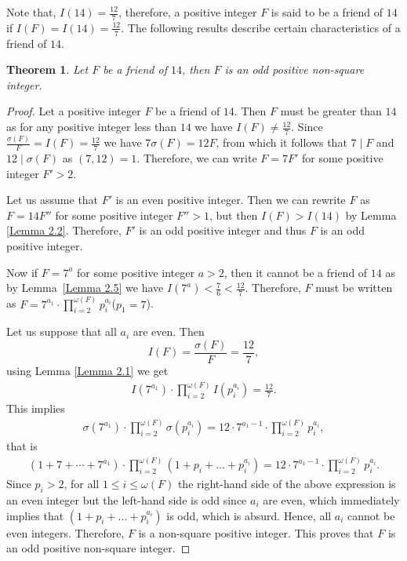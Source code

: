 \documentclass[11pt,twoside]{amsart}
\newtheorem{theorem}{Theorem}[section]
\begin{document}
Note that, $I(14)=\frac{12}{7}$, therefore, a positive integer $F$ is said to be a friend of $14$ if $I(F)=I(14)=\frac{12}{7}$. The following results describe certain characteristics of a friend of $14$.
\begin{theorem}\label{thm 3.1}
Let $F$ be a friend of $14$, then $F$ is an odd positive non-square integer.   
\end{theorem}
\begin{proof}
    Let a positive integer $F$ be a friend of $14$. Then $F$ must be greater than $14$ as for any positive integer less than $14$ we have $I(F)\neq \frac{12}{7}$. Since $\frac{\sigma(F)}{F}=I(F)=\frac{12}{7}$ we have $7\sigma(F)=12F$, from which it follows that $7\mid F$ and $12\mid \sigma(F)$ as $(7,12)=1$. Therefore, we can write $F=7F'$ for some positive integer $F'>2$. 

Let us  assume that $F'$ is an even positive integer. Then we can rewrite $F$ as $F=14F''$ for some positive integer $F''>1$, but then $I(F)>I(14)$ by Lemma \ref{Lemma 2.2}. Therefore, $F'$ is an odd positive integer and thus $F$ is an odd positive integer.

    Now if $F=7^a$ for some positive integer $a>2$, then it cannot be a friend of $14$ as by Lemma~\ref{Lemma 2.5} we have $I(7^{a})<\frac{7}{6}<\frac{12}{7}$. Therefore, $F$ must be written as $\displaystyle{F=7^{a_{1}}\cdot \prod_{i=2}^{\omega(F)}p_{i}^{a_{i}}}$($p_1=7$). 

Let us suppose that all $a_i$ are even. Then
$$I(F)=\frac{\sigma(F)}{F}=\frac{12}{7},$$
using Lemma \ref{Lemma 2.1} we get
\begin{align*}
   I(7^{a_1})\cdot \prod_{i=2}^{\omega(F)}I(p_{i}^{a_i})=\frac{12}{7}.
   \end{align*}
   This implies
   \begin{align*}
 \sigma(7^{a_1})\cdot \prod_{i=2}^{\omega(F)}\sigma(p_i^{a_i})=12\cdot7^{{a_1}-1}\cdot\prod_{i=2}^{\omega(F)}p_{i}^{a_i},
\end{align*}
that is
\begin{align*}
 (1+7+ \cdots +7^{a_1})\cdot\prod_{i=2}^{\omega(F)}(1+p_i+\dots+p_i^{a_i})=12\cdot7^{{a_1}-1}\cdot\prod_{i=2}^{\omega(F)}p_{i}^{a_i}.
\end{align*}
Since $p_i>2$, for all $1\leq i\leq \omega(F)$ the right-hand side of the above expression is an even integer but the left-hand side is odd since $a_i$ are even, which immediately implies that $(1+p_i+\dots+p_i^{a_i})$ is odd, which is absurd. Hence, all $a_i$ cannot be even integers. Therefore, $F$ is a non-square positive integer. This proves that $F$ is an odd positive non-square integer.
\end{proof}
\end{document}
